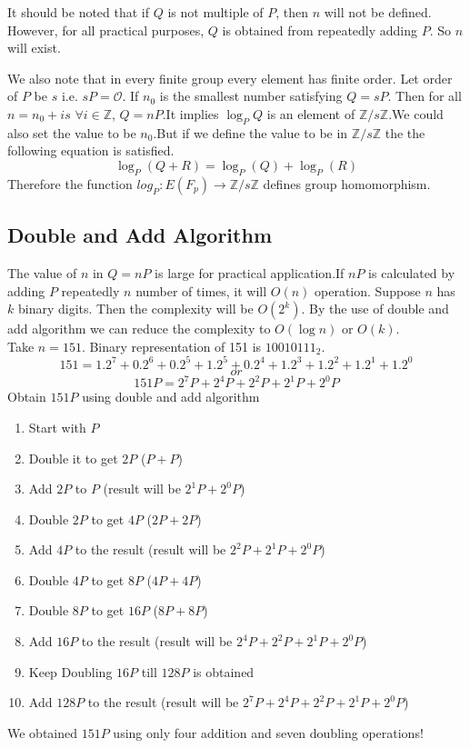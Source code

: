 \documentclass[a4paper,12pt]{report}
\begin{document}
	It should be noted that if $Q$ is not multiple of $P$, then $n$ will not be defined. However, for all practical purposes, $Q$ is obtained from repeatedly adding $P$. So $n$ will exist.

	We also note that in every finite group every element has finite order. Let order of $P$ be $s$ i.e. $s P=\mathscr{O}$. If $n_0$ is the smallest number satisfying $Q=sP$. Then for all $n=n_0+is$ $ \forall i \in \mathbb{Z} $, $Q=nP$.It implies $\log_P Q$ is an element of  $\mathbb{Z}/s\mathbb{Z}$.We could also set the value to be $n_0$.But if we define the value to be in $\mathbb{Z}/s\mathbb{Z}$ the the following equation is satisfied.
$$\log_P(Q+R)=\log_P(Q)+\log_P(R)$$
Therefore the function
$log_P:E(F_p)\rightarrow \mathbb{Z}/s\mathbb{Z}$ defines group homomorphism.
\subsection{Double and Add Algorithm}
The value of $n$ in $Q=nP$ is large for practical application.If $nP$ is calculated by adding $P$ repeatedly $n$ number of times, it will $O(n)$ operation. Suppose $n$ has $k$ binary digits. Then the complexity will be $O(2^k)$. By the use of double and add algorithm we can reduce the complexity to $O(\log {n})$ or $O(k)$.\\
Take $n=151$. Binary representation of 151 is $10010111_2$.
$$151=1.2^7+0.2^6+0.2^5+1.2^5+0.2^4+1.2^3+1.2^2+1.2^1+1.2^0$$
$$or$$
$$151P = 2^7P+2^4P+2^2P+2^1P+2^0P$$
Obtain $151P$ using double and add algorithm
\begin{enumerate}
	\item Start with $P$
	\item Double it to get $2P$ ($P+P$)
	\item Add $2P$ to $P$ (result will be $2^1P+2^0P$)
	\item Double $2P$ to get $4P$ ($2P+2P$)
	\item Add $4P$ to the result (result will be $2^2P+2^1P+2^0P$)
	\item Double $4P$ to get $8P$ ($4P+4P$)
	\item Double $8P$ to get $16P$ ($8P+8P$)
	\item Add $16P$ to the result (result will be $2^4P+2^2P+2^1P+2^0P$)
	\item Keep Doubling $16P$ till $128P$ is obtained
	\item Add $128P$ to the result (result will be $2^7P+2^4P+2^2P+2^1P+2^0P$)
\end{enumerate}
We obtained $151P$ using only four addition and seven doubling operations!
\end{document}
